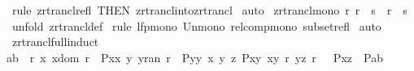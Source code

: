 \begin{isabellebody}
\ {\isacharparenleft}rule\ zrtrancl{\isacharunderscore}refl\ {\isacharbrackleft}THEN\ zrtrancl{\isacharunderscore}into{\isacharunderscore}zrtrancl{\isacharbrackright}{\isacharparenright}\isanewline
{}\isamarkupfalse%
\ auto\isanewline
{}\isamarkupfalse%
%
\endisatagproof
{\isafoldproof}%
%
\isadelimproof
\isanewline
%
\endisadelimproof
\isanewline
\isanewline
\isanewline
\isanewline
\isanewline
\isanewline
{}\isamarkupfalse%
\ zrtrancl{\isacharunderscore}mono{\isacharcolon}\ {\isachardoublequoteopen}{\isacharbang}{\isacharbang}r{\isachardot}\ r\ {\isacharless}{\isacharequal}\ s\ {\isacharequal}{\isacharequal}{\isachargreater}\ r{\isacharpercent}{\isacharasterisk}\ {\isacharless}{\isacharequal}\ s{\isacharpercent}{\isacharasterisk}{\isachardoublequoteclose}\isanewline
%
\isadelimproof
%
\endisadelimproof
%
\isatagproof
{}\isamarkupfalse%
\ {\isacharparenleft}unfold\ zrtrancl{\isacharunderscore}def{\isacharparenright}\isanewline
{}\isamarkupfalse%
\ {\isacharparenleft}rule\ lfp{\isacharunderscore}mono\ Un{\isacharunderscore}mono\ rel{\isacharunderscore}comp{\isacharunderscore}mono\ subset{\isacharunderscore}refl{\isacharparenright}{\isacharplus}\isanewline
{}\isamarkupfalse%
\ {\isacharparenleft}auto{\isacharparenright}\isanewline
{}\isamarkupfalse%
%
\endisatagproof
{\isafoldproof}%
%
\isadelimproof
\isanewline
%
\endisadelimproof
\isanewline
\isanewline
\isanewline
{}\isamarkupfalse%
\ zrtrancl{\isacharunderscore}full{\isacharunderscore}induct{\isacharcolon}\isanewline
{\isachardoublequoteopen}{\isasymlbrakk}{\isacharparenleft}a{\isacharcomma}b{\isacharparenright}\ {\isacharcolon}\ r{\isacharpercent}{\isacharasterisk}{\isacharsemicolon}\ {\isacharbang}{\isacharbang}x{\isachardot}\ x{\isacharcolon}dom\ r\ {\isasymLongrightarrow}\ P{\isacharparenleft}x{\isacharcomma}x{\isacharparenright}{\isacharsemicolon}\ {\isacharbang}{\isacharbang}y{\isachardot}\ y{\isacharcolon}ran\ r\ {\isasymLongrightarrow}\ P{\isacharparenleft}y{\isacharcomma}y{\isacharparenright}{\isacharsemicolon}\ {\isacharbang}{\isacharbang}x\ y\ z{\isachardot}{\isasymlbrakk}\ P{\isacharparenleft}x{\isacharcomma}y{\isacharparenright}{\isacharsemicolon}\ {\isacharparenleft}x{\isacharcomma}y{\isacharparenright}{\isacharcolon}\ r{\isacharpercent}{\isacharasterisk}{\isacharsemicolon}\ {\isacharparenleft}y{\isacharcomma}z{\isacharparenright}{\isacharcolon}\ r\ {\isasymrbrakk}\ {\isasymLongrightarrow}\ P{\isacharparenleft}x{\isacharcomma}z{\isacharparenright}{\isasymrbrakk}\ {\isasymLongrightarrow}\ P{\isacharparenleft}a{\isacharcomma}b{\isacharparenright}{\isachardoublequoteclose}\isanewline

\end{isabellebody}
